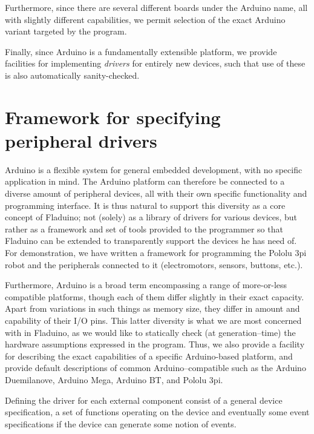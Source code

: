 \documentclass[a4paper, oneside, draft]{memoir}
\begin{document}
\begin{itemize}
  Furthermore, since there are several different boards under the
  Arduino name, all with slightly different capabilities, we permit
  selection of the exact Arduino variant targeted by the program.

  Finally, since Arduino is a fundamentally extensible platform, we
  provide facilities for implementing \textit{drivers} for entirely
  new devices, such that use of these is also automatically
  sanity-checked.
\end{itemize}

\section{Framework for specifying peripheral drivers}
Arduino is a flexible system for general embedded development, with no
specific application in mind.  The Arduino platform can therefore be
connected to a diverse amount of peripheral devices, all with their
own specific functionality and programming interface.  It is thus
natural to support this diversity as a core concept of Fladuino; not
(solely) as a library of drivers for various devices, but rather as a
framework and set of tools provided to the programmer so that Fladuino
can be extended to transparently support the devices he has need of.
For demonstration, we have  written a
framework for programming the Pololu 3pi robot and the peripherals
connected to it (electromotors, sensors, buttons, etc.).

Furthermore, Arduino is a broad term encompassing a range of
more-or-less compatible platforms, though each of them differ slightly
in their exact capacity.  Apart from variations in such things as
memory size, they differ in amount and capability of their I/O pins.
This latter diversity is what we are most concerned with in Fladuino,
as we would like to statically check (at generation--time) the
hardware assumptions expressed in the program.  Thus, we also provide
a facility for describing the exact capabilities of a specific
Arduino-based platform, and provide default descriptions of common
Arduino--compatible such as the Arduino Duemilanove, Arduino Mega,
Arduino BT, and Pololu 3pi.

Defining the driver for each external component consist of a general
device specification, a set of functions operating on the device and
eventually some event specifications if the device can generate
some notion of events.

\end{document}
